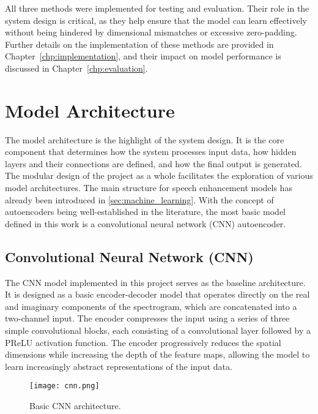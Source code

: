 All three methods were implemented for testing and evaluation. Their role in the system design is critical, as they help ensure that the model can learn effectively without being hindered by dimensional mismatches or excessive zero-padding. Further details on the implementation of these methods are provided in Chapter~\ref{chp:implementation}, and their impact on model performance is discussed in Chapter~\ref{chp:evaluation}.

\section{Model Architecture}
\label{sec:model_architecture}

The model architecture is the highlight of the system design. It is the core component that determines how the system processes input data, how hidden layers and their connections are defined, and how the final output is generated. The modular design of the project as a whole facilitates the exploration of various model architectures. The main structure for speech enhancement models has already been introduced in \ref{sec:machine_learning}. With the concept of autoencoders being well-established in the literature, the most basic model defined in this work is a convolutional neural network (CNN) autoencoder.

\subsection{Convolutional Neural Network (CNN)}

The CNN model implemented in this project serves as the baseline architecture. It is designed as a basic encoder-decoder model that operates directly on the real and imaginary components of the spectrogram, which are concatenated into a two-channel input. The encoder compresses the input using a series of three simple convolutional blocks, each consisting of a convolutional layer followed by a PReLU activation function. The encoder progressively reduces the spatial dimensions while increasing the depth of the feature maps, allowing the model to learn increasingly abstract representations of the input data.

\begin{figure}[h]
    \centering
    \texttt{[image: cnn.png]}
    \caption{\label{fig:cnn}Basic CNN architecture.}
\end{figure}


